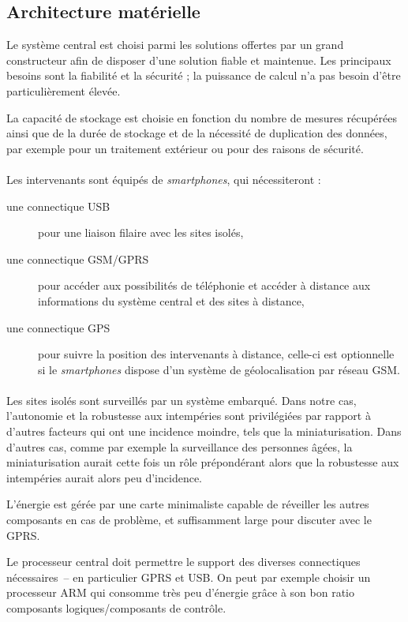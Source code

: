 \documentclass[a4paper, 11pt, final]{article}
\begin{document}
\subsection{Architecture matérielle}
Le système central est choisi parmi les solutions offertes par un
grand constructeur afin de disposer d'une solution fiable et
maintenue. Les principaux besoins sont la fiabilité et la sécurité ; la
puissance de calcul n'a pas besoin d'être particulièrement élevée.

La capacité de stockage est choisie en fonction du nombre de mesures
récupérées ainsi que de la durée de stockage et de la nécessité de
duplication des données, par exemple pour un traitement extérieur ou
pour des raisons de sécurité.

\paragraph{}
Les intervenants sont équipés de \emph{smartphones}, qui nécessiteront
:
\begin{description}
\item[une connectique USB] pour une liaison filaire avec les sites isolés,
\item[une connectique GSM/GPRS] pour accéder aux possibilités de
  téléphonie et accéder à distance aux informations du système central
  et des sites à distance,
\item[une connectique GPS] pour suivre la position des intervenants à distance,
  celle-ci est optionnelle si le \emph{smartphones} dispose d'un système
  de géolocalisation par réseau GSM.
\end{description}

\paragraph{}
Les sites isolés sont surveillés par un système embarqué. Dans notre
cas, l'autonomie et la robustesse aux intempéries sont privilégiées
par rapport à d'autres facteurs qui ont une incidence moindre, tels
que la miniaturisation. Dans d'autres cas, comme par exemple la
surveillance des personnes âgées, la miniaturisation aurait cette fois
un rôle prépondérant alors que la robustesse aux intempéries aurait
alors peu d'incidence.

L'énergie est gérée par une carte minimaliste capable de réveiller les
autres composants en cas de problème, et suffisamment large pour
discuter avec le GPRS.

Le processeur central doit permettre le support des diverses
connectiques nécessaires~-- en particulier GPRS et USB. On peut par
exemple choisir un processeur ARM qui consomme très peu d'énergie
grâce à son bon ratio composants logiques/composants de contrôle.
\end{document}
